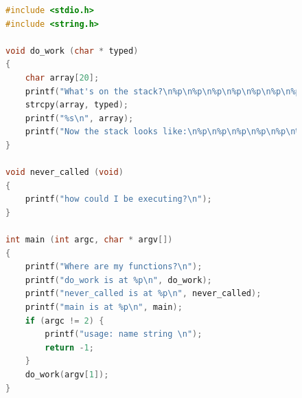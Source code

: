 \documentclass[11pt,a4paper]{report}
\begin{document}
	\begin{figure}
	\begin{lstlisting}[language=C, label={lst:c}, caption={The C code of a program vulnerable to a buffer overflow attack.}]
#include <stdio.h>
#include <string.h>

void do_work (char * typed)
{
    char array[20];
    printf("What's on the stack?\n%p\n%p\n%p\n%p\n%p\n%p\n%p\n%p\n%p\n%p\n%p\n%p\n%p\n%p\n%p\n%p\n%p\n%p\n\n");
    strcpy(array, typed);
    printf("%s\n", array);
    printf("Now the stack looks like:\n%p\n%p\n%p\n%p\n%p\n%p\n%p\n%p\n%p\n%p\n%p\n%p\n%p\n%p\n%p\n%p\n%p\n%p\n\n");
}

void never_called (void)
{
    printf("how could I be executing?\n");
}

int main (int argc, char * argv[])
{
    printf("Where are my functions?\n");
    printf("do_work is at %p\n", do_work);
    printf("never_called is at %p\n", never_called);
    printf("main is at %p\n", main);
    if (argc != 2) {
        printf("usage: name string \n");
        return -1;
    }
    do_work(argv[1]);
}
	\end{lstlisting}
	\end{figure}
\end{document}

